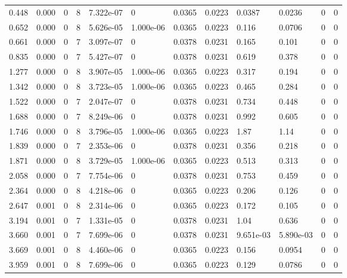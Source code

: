 \documentclass[preview]{standalone}
\begin{document}
{{\begin{tabular}{L{1.2cm}C{1.2cm} C{0.3cm}C{0.5cm} C{1.4cm}C{1.4cm} C{1.4cm}C{1.4cm} C{1.6cm}C{1.6cm} C{1.6cm}C{1.6cm}}
  0.448  &  0.000  & 0     &  8 &  7.322e-07  & 0  &  0.0365&   0.0223& 0.0387 & 0.0236   &  0 & 0  \\ 
  0.652  &  0.000  & 0     &  8 &  5.626e-05  & 1.000e-06  &  0.0365&   0.0223& 0.116 & 0.0706   &  0 & 0  \\ 
  0.661  &  0.000  & 0     &  7 &  3.097e-07  & 0  &  0.0378&   0.0231& 0.165 & 0.101   &  0 & 0  \\ 
  0.835  &  0.000  & 0     &  7 &  5.427e-07  & 0  &  0.0378&   0.0231& 0.619 & 0.378   &  0 & 0  \\ 
  1.277  &  0.000  & 0     &  8 &  3.907e-05  & 1.000e-06  &  0.0365&   0.0223& 0.317 & 0.194   &  0 & 0  \\ 
  1.342  &  0.000  & 0     &  8 &  3.723e-05  & 1.000e-06  &  0.0365&   0.0223& 0.465 & 0.284   &  0 & 0  \\ 
  1.522  &  0.000  & 0     &  7 &  2.047e-07  & 0  &  0.0378&   0.0231& 0.734 & 0.448   &  0 & 0  \\ 
  1.688  &  0.000  & 0     &  7 &  8.249e-06  & 0  &  0.0378&   0.0231& 0.992 & 0.605   &  0 & 0  \\ 
  1.746  &  0.000  & 0     &  8 &  3.796e-05  & 1.000e-06  &  0.0365&   0.0223& 1.87 & 1.14   &  0 & 0  \\ 
  1.839  &  0.000  & 0     &  7 &  2.353e-06  & 0  &  0.0378&   0.0231& 0.356 & 0.218   &  0 & 0  \\ 
  1.871  &  0.000  & 0     &  8 &  3.729e-05  & 1.000e-06  &  0.0365&   0.0223& 0.513 & 0.313   &  0 & 0  \\ 
  2.058  &  0.000  & 0     &  7 &  7.754e-06  & 0  &  0.0378&   0.0231& 0.753 & 0.459   &  0 & 0  \\ 
  2.364  &  0.000  & 0     &  8 &  4.218e-06  & 0  &  0.0365&   0.0223& 0.206 & 0.126   &  0 & 0  \\ 
  2.647  &  0.001  & 0     &  8 &  2.314e-06  & 0  &  0.0365&   0.0223& 0.172 & 0.105   &  0 & 0  \\ 
  3.194  &  0.001  & 0     &  7 &  1.331e-05  & 0  &  0.0378&   0.0231& 1.04 & 0.636   &  0 & 0  \\ 
  3.660  &  0.001  & 0     &  7 &  7.699e-06  & 0  &  0.0378&   0.0231& 9.651e-03 & 5.890e-03   &  0 & 0  \\ 
  3.669  &  0.001  & 0     &  8 &  4.460e-06  & 0  &  0.0365&   0.0223& 0.156 & 0.0954   &  0 & 0  \\ 
  3.959  &  0.001  & 0     &  8 &  7.699e-06  & 0  &  0.0365&   0.0223& 0.129 & 0.0786   &  0 & 0  \\ 

\end{tabular}}}
\end{document}
